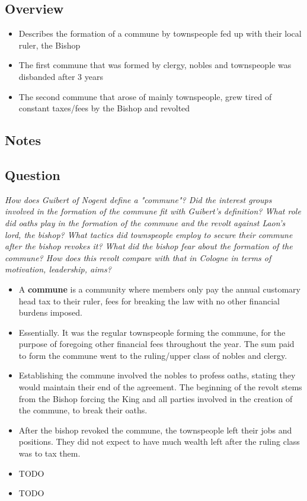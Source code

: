 \documentclass[12pt]{article}
\begin{document}
{\subsection*{Overview}
\begin{itemize}
	\item Describes the formation of a commune by townspeople fed up with their local ruler, the Bishop
	\item The first commune that was formed by clergy, nobles and townspeople was disbanded after 3 years
	\item The second commune that arose of mainly townspeople, grew tired of constant taxes/fees by the Bishop and revolted
\end{itemize}

\subsection*{Notes}

\subsection*{Question}

\textit{How does Guibert of Nogent define a "commune"? Did the interest groups involved in the formation of the commune fit with Guibert's definition? What role did oaths play in the formation of the commune and the revolt against Laon's lord, the bishop? What tactics did townspeople employ to secure their commune after the bishop revokes it? What did the bishop fear about the formation of the commune? How does this revolt compare with that in Cologne in terms of motivation, leadership, aims?}

\begin{itemize}
	\item A \textbf{commune} is a community where members only pay the annual customary head tax to their ruler, fees for breaking the law with no other financial burdens imposed.
	\item Essentially. It was the regular townspeople forming the commune, for the purpose of foregoing other financial fees throughout the year. The sum paid to form the commune went to the ruling/upper class of nobles and clergy.
	\item Establishing the commune involved the nobles to profess oaths, stating they would maintain their end of the agreement. The beginning of the revolt stems from the Bishop forcing the King and all parties involved in the creation of the commune, to break their oaths.
	\item After the bishop revoked the commune, the townspeople left their jobs and positions. They did not expect to have much wealth left after the ruling class was to tax them.
	\item TODO
	\item TODO
\end{itemize}

}
\end{document}
